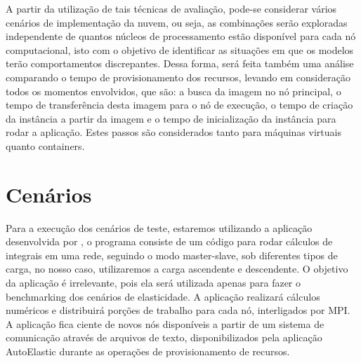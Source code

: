 \documentclass[twoside,english,brazilian]{UNISINOSartigo}
\begin{document}
A partir da utilização de tais técnicas de avaliação, pode-se considerar vários cenários de implementação da nuvem, ou seja, as combinações serão exploradas independente de quantos núcleos de processamento estão disponível para cada nó computacional, isto com o objetivo de identificar as situações em que os modelos terão comportamentos discrepantes. Dessa forma, será feita também uma análise comparando o tempo de provisionamento dos recursos, levando em consideração todos os momentos envolvidos, que são: a busca da imagem no nó principal, o tempo de transferência desta imagem para o nó de execução, o tempo de criação da instância a partir da imagem e o tempo de inicialização da instância para rodar a aplicação. Estes passos são considerados tanto para máquinas virtuais quanto containers. 

\section{Cenários}
\label{cenarios}

Para a execução dos cenários de teste, estaremos utilizando a aplicação desenvolvida por , o programa consiste de um código para rodar cálculos de integrais em uma rede, seguindo o modo master-slave, sob diferentes tipos de carga, no nosso caso, utilizaremos a carga ascendente e descendente. O objetivo da aplicação é irrelevante, pois ela será utilizada apenas para fazer o benchmarking dos cenários de elasticidade. A aplicação realizará cálculos numéricos e distribuirá porções de trabalho para cada nó, interligados por MPI. A aplicação fica ciente de novos nós disponíveis a partir de um sistema de comunicação através de arquivos de texto, disponibilizados pela aplicação AutoElastic durante as operações de provisionamento de recursos.



\end{document}

